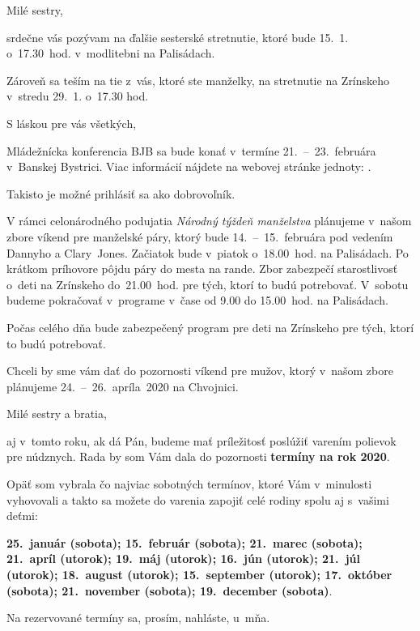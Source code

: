 Milé sestry,

srdečne vás pozývam na ďalšie sesterské stretnutie, ktoré bude 15.~1. o~17.30~hod. v~modlitebni na Palisádach.

Zároveň sa teším na tie z~vás, ktoré ste manželky, na stretnutie na Zrínskeho v~stredu 29.~1. o~17.30 hod.

S láskou pre vás všetkých,



Mládežnícka konferencia BJB sa bude konať v~termíne 21.~--~23.~februára v~Banskej Bystrici. Viac informácií nájdete na webovej stránke jednoty: .

Takisto je možné prihlásiť sa ako dobrovoľník.


V rámci celonárodného podujatia {\it Národný týždeň manželstva} plánujeme v~našom zbore víkend pre manželské páry, ktorý bude 14.~--~15.~februára pod vedením Dannyho a Clary~Jones. Začiatok bude v~piatok o~18.00~hod. na Palisádach. Po krátkom príhovore pôjdu páry do mesta na rande. Zbor zabezpečí starostlivosť o~deti na Zrínskeho do~21.00~hod. pre tých, ktorí to budú potrebovať. V~sobotu budeme pokračovať v~programe v~čase od 9.00 do 15.00~hod. na Palisádach.

Počas celého dňa bude zabezpečený program pre deti na Zrínskeho pre tých, ktorí to budú potrebovať.


Chceli by sme vám dať do pozornosti víkend pre mužov, ktorý v~našom zbore plánujeme 24.~--~26.~apríla~2020 na Chvojnici.


Milé sestry a bratia,

aj v~tomto roku, ak dá Pán, budeme mať príležitosť poslúžiť varením polievok pre núdznych. Rada by som Vám dala do pozornosti {\bf termíny na rok 2020}.

Opäť som vybrala čo najviac sobotných termínov, ktoré Vám v~minulosti vyhovovali a takto sa možete do varenia zapojiť celé rodiny spolu aj s~vašimi deťmi:

{\bf 25.~január (sobota); 15.~február (sobota); 21.~marec (sobota); 21.~apríl (utorok); 19.~máj (utorok); 16.~jún (utorok); 21.~júl (utorok); 18.~august (utorok); 15.~september (utorok); 17.~október (sobota); 21.~november (sobota); 19.~december (sobota)}.

Na rezervované termíny sa, prosím, nahláste, u~mňa.

